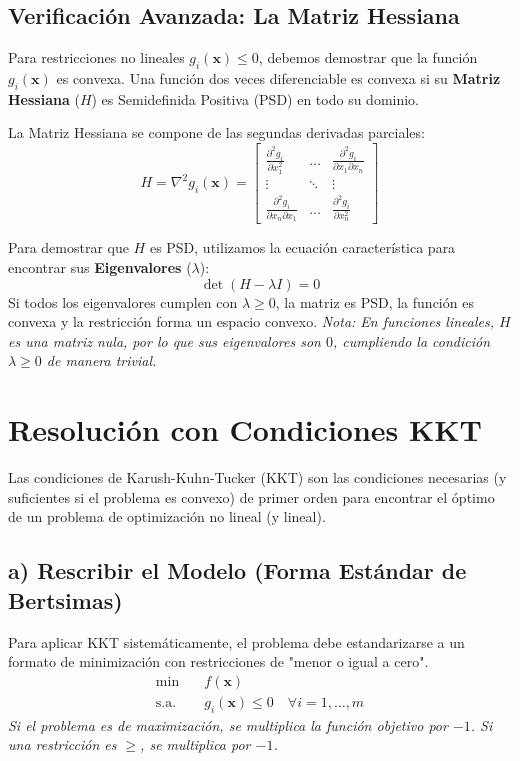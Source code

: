 \documentclass{article}
\begin{document}
	\subsection{Verificación Avanzada: La Matriz Hessiana}
	Para restricciones no lineales $g_i(\mathbf{x}) \leq 0$, debemos demostrar que la función $g_i(\mathbf{x})$ es convexa. Una función dos veces diferenciable es convexa si su \textbf{Matriz Hessiana} ($H$) es Semidefinida Positiva (PSD) en todo su dominio.
	
	La Matriz Hessiana se compone de las segundas derivadas parciales:
	$$H = \nabla^2 g_i(\mathbf{x}) = \begin{bmatrix}
		\frac{\partial^2 g_i}{\partial x_1^2} & \dots & \frac{\partial^2 g_i}{\partial x_1 \partial x_n} \\
		\vdots & \ddots & \vdots \\
		\frac{\partial^2 g_i}{\partial x_n \partial x_1} & \dots & \frac{\partial^2 g_i}{\partial x_n^2}
	\end{bmatrix}$$
	
	Para demostrar que $H$ es PSD, utilizamos la ecuación característica para encontrar sus \textbf{Eigenvalores} ($\lambda$):
	$$\det(H - \lambda I) = 0$$
	Si todos los eigenvalores cumplen con $\lambda \geq 0$, la matriz es PSD, la función es convexa y la restricción forma un espacio convexo. \textit{Nota: En funciones lineales, $H$ es una matriz nula, por lo que sus eigenvalores son $0$, cumpliendo la condición $\lambda \geq 0$ de manera trivial.}
	
	\newpage
	
	\section{Resolución con Condiciones KKT}
	Las condiciones de Karush-Kuhn-Tucker (KKT) son las condiciones necesarias (y suficientes si el problema es convexo) de primer orden para encontrar el óptimo de un problema de optimización no lineal (y lineal).
	
	\subsection*{a) Rescribir el Modelo (Forma Estándar de Bertsimas)}
	Para aplicar KKT sistemáticamente, el problema debe estandarizarse a un formato de minimización con restricciones de "menor o igual a cero".
	$$\begin{aligned}
		\min \quad & f(\mathbf{x}) \\
		\text{s.a.} \quad & g_i(\mathbf{x}) \leq 0 \quad \forall i = 1, \dots, m
	\end{aligned}$$
	\textit{Si el problema es de maximización, se multiplica la función objetivo por $-1$. Si una restricción es $\geq$, se multiplica por $-1$.}
	
\end{document}
